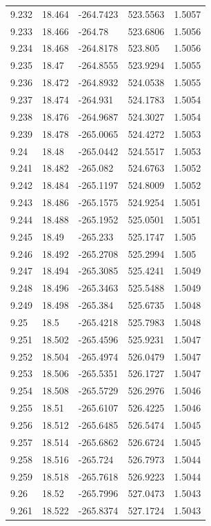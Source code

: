\begin{tabular}{lllll}
9.232 & 18.464 & -264.7423 & 523.5563 & 1.5057 \\
9.233 & 18.466 & -264.78 & 523.6806 & 1.5056 \\
9.234 & 18.468 & -264.8178 & 523.805 & 1.5056 \\
9.235 & 18.47 & -264.8555 & 523.9294 & 1.5055 \\
9.236 & 18.472 & -264.8932 & 524.0538 & 1.5055 \\
9.237 & 18.474 & -264.931 & 524.1783 & 1.5054 \\
9.238 & 18.476 & -264.9687 & 524.3027 & 1.5054 \\
9.239 & 18.478 & -265.0065 & 524.4272 & 1.5053 \\
9.24 & 18.48 & -265.0442 & 524.5517 & 1.5053 \\
9.241 & 18.482 & -265.082 & 524.6763 & 1.5052 \\
9.242 & 18.484 & -265.1197 & 524.8009 & 1.5052 \\
9.243 & 18.486 & -265.1575 & 524.9254 & 1.5051 \\
9.244 & 18.488 & -265.1952 & 525.0501 & 1.5051 \\
9.245 & 18.49 & -265.233 & 525.1747 & 1.505 \\
9.246 & 18.492 & -265.2708 & 525.2994 & 1.505 \\
9.247 & 18.494 & -265.3085 & 525.4241 & 1.5049 \\
9.248 & 18.496 & -265.3463 & 525.5488 & 1.5049 \\
9.249 & 18.498 & -265.384 & 525.6735 & 1.5048 \\
9.25 & 18.5 & -265.4218 & 525.7983 & 1.5048 \\
9.251 & 18.502 & -265.4596 & 525.9231 & 1.5047 \\
9.252 & 18.504 & -265.4974 & 526.0479 & 1.5047 \\
9.253 & 18.506 & -265.5351 & 526.1727 & 1.5047 \\
9.254 & 18.508 & -265.5729 & 526.2976 & 1.5046 \\
9.255 & 18.51 & -265.6107 & 526.4225 & 1.5046 \\
9.256 & 18.512 & -265.6485 & 526.5474 & 1.5045 \\
9.257 & 18.514 & -265.6862 & 526.6724 & 1.5045 \\
9.258 & 18.516 & -265.724 & 526.7973 & 1.5044 \\
9.259 & 18.518 & -265.7618 & 526.9223 & 1.5044 \\
9.26 & 18.52 & -265.7996 & 527.0473 & 1.5043 \\
9.261 & 18.522 & -265.8374 & 527.1724 & 1.5043 \\

\end{tabular}
